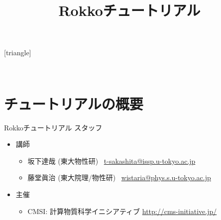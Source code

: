 \title{Rokkoチュートリアル}



[triangle]



\begin{frame}
  \titlepage
   \\
\end{frame}


\section{チュートリアルの概要}

\begin{frame}{Rokkoチュートリアル スタッフ}
  \begin{itemize}
  \item 講師
    \setlength{\itemsep}{1em}
    \begin{itemize}
      \setlength{\itemsep}{1em}
    \item 坂下達哉 (東大物性研) \ \href{mailto:t-sakashita@issp.u-tokyo.ac.jp}{t-sakashita@issp.u-tokyo.ac.jp}
    \item 藤堂眞治 (東大院理/物性研) \ \href{mailto:wistaria@phys.s.u-tokyo.ac.jp}{wistaria@phys.s.u-tokyo.ac.jp}
    \end{itemize}
  \item 主催
    \begin{itemize}
    \item CMSI: 計算物質科学イニシアティブ \url{http://cms-initiative.jp/}
    \end{itemize}
  \end{itemize}
\end{frame}

